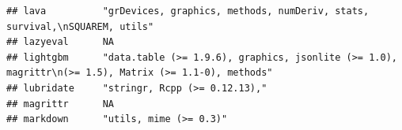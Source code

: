 \documentclass[]{article}
\begin{document}
\begin{verbatim}
## lava          "grDevices, graphics, methods, numDeriv, stats, survival,\nSQUAREM, utils"                                                                                                                                                                                                                                                                                                                                                                                                            
## lazyeval      NA                                                                                                                                                                                                                                                                                                                                                                                                                                                                                    
## lightgbm      "data.table (>= 1.9.6), graphics, jsonlite (>= 1.0), magrittr\n(>= 1.5), Matrix (>= 1.1-0), methods"                                                                                                                                                                                                                                                                                                                                                                                  
## lubridate     "stringr, Rcpp (>= 0.12.13),"                                                                                                                                                                                                                                                                                                                                                                                                                                                         
## magrittr      NA                                                                                                                                                                                                                                                                                                                                                                                                                                                                                    
## markdown      "utils, mime (>= 0.3)"                                                                                                                                                                                                                                                                                                                                                                                                                                                                

\end{verbatim}
\end{document}
